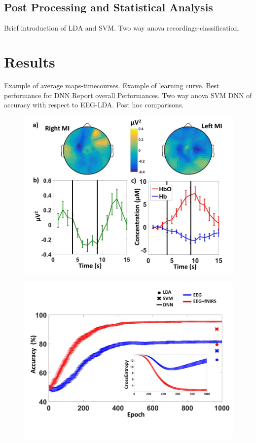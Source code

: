 \documentclass[12pt ]{iopart}
\begin{document}
\subsection{Post Processing and Statistical Analysis}
Brief introduction of LDA and SVM.
Two way anova recordings-classification.


\subsection{}
\section{Results}
Example of average maps-timecourses.
Example of learning curve.
Best performance for DNN
Report overall Performances.
Two way anova SVM DNN of accuracy with respect to EEG-LDA.
Post hoc comparisons.
\begin{figure}
	\includegraphics[width=\linewidth]{Diapositiva4.JPG}
	\caption{}
	\label{fig:fig4}
\end{figure}
\begin{figure}
	\includegraphics[width=\linewidth]{Diapositiva5.JPG}
	\caption{}
	\label{fig:fig5}
\end{figure}
\end{document}
